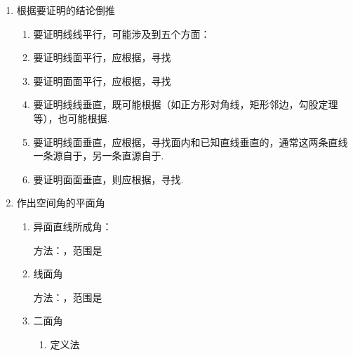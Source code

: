 \begin{enumerate}
\begin{enumerate}
        \item 当条件中出现了线线垂直，在没有结合其他条件时，只能根据推出
        \item 当条件中出现了面面垂直，在没有结合其他条件时，只能根据推出
        \item 当条件中出现了线面垂直，可能根据推出，还可能是根据推出.
    \end{enumerate}

    \item 根据要证明的结论倒推
    \begin{enumerate}
        \item 要证明线线平行，可能涉及到五个方面：
        
        \item 要证明线面平行，应根据，寻找
        \item 要证明面面平行，应根据，寻找
    
        \item 要证明线线垂直，既可能根据（如正方形对角线，矩形邻边，勾股定理等），也可能根据.
        
        \item 要证明线面垂直，应根据，寻找面内和已知直线垂直的，通常这两条直线一条源自于，另一条直源自于.

        \item 要证明面面垂直，则应根据，寻找.
    \end{enumerate}

    \clearpage

    \item 作出空间角的平面角
    \begin{enumerate}
        \item 异面直线所成角：

        方法：，范围是\blkda[4]{$\left(0, \dfrac{\pi}{2}\right]$}
        \item 线面角
        
        方法：，范围是
        \item 二面角
            \begin{enumerate}
                \item 定义法
        

\end{enumerate}
\end{enumerate}
\end{enumerate}
